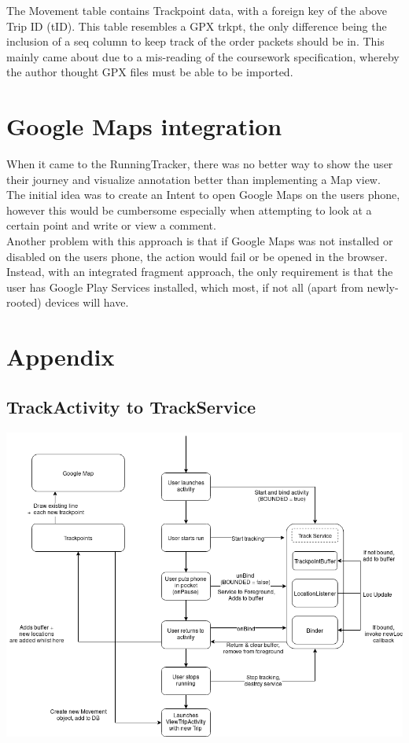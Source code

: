 \documentclass[11pt]{article}
\begin{document}
The Movement table contains Trackpoint data, with a foreign key of the above Trip ID (tID). This table resembles a GPX trkpt, the only difference being the inclusion of a seq column to keep track of the order packets should be in. This mainly came about due to a mis-reading of the coursework specification, whereby the author thought GPX files must be able to be imported.

\newpage


\section{Google Maps integration}
When it came to the RunningTracker, there was no better way to show the user their journey and visualize annotation better than implementing a Map view. \\

The initial idea was to create an Intent to open Google Maps on the users phone, however this would be cumbersome especially when attempting to look at a certain point and write or view a comment.\\


Another problem with this approach is that if Google Maps was not installed or disabled on the users phone, the action would fail or be opened in the browser. Instead, with an integrated fragment approach, the only requirement is that the user has Google Play Services installed, which most, if not all (apart from newly-rooted) devices will have.\\



\newpage

\section{Appendix}

\subsection{TrackActivity to TrackService}
\includegraphics[width=\linewidth]{trackservice}
\end{document}
